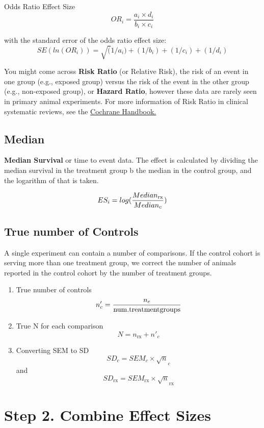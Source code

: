 \documentclass[
]{book}
\begin{document}
Odds Ratio Effect Size
\[ OR_i = \frac {a_i \times d_i}{b_i \times c_i}  \]

with the standard error of the odds ratio effect size:
\[ SE(ln(OR_i)) = \sqrt (1/a_i)+(1/b_i)+(1/c_i)+(1/d_i)    \]

You might come across \textbf{Risk Ratio} (or Relative Risk), the risk of an event in one group (e.g., exposed group) versus the risk of the event in the other group (e.g., non-exposed group), or \textbf{Hazard Ratio}, however these data are rarely seen in primary animal experiments. For more information of Risk Ratio in clinical systematic reviews, see the \href{https://handbook-5-1.cochrane.org/chapter_9/box_9_2_a_calculation_of_risk_ratio_rr_odds_ratio_or_and.htm}{Cochrane Handbook.}

\hypertarget{median}{%
\subsection{Median}\label{median}}

\textbf{Median Survival} or time to event data. The effect is calculated by dividing the median survival in the treatment group b the median in the control group, and the logarithm of that is taken.

\[ ES_i = log (\frac{Median_{\rm rx}}{Median_c} ) \]

\hypertarget{true-number-of-controls}{%
\subsection{True number of Controls}\label{true-number-of-controls}}

A single experiment can contain a number of comparisons. If the control cohort is serving more than one treatment group, we correct the number of animals reported in the control cohort by the number of treatment groups.

\begin{enumerate}
\def\labelenumi{(\arabic{enumi})}
\item
  True number of controls
  \[n'_c = \frac{n_c}{{\rm num. treatment groups}}\]
\item
  True N for each comparison
  \[N = n_{\text{rx}} + n'_c\]
\item
  Converting SEM to SD
  \[ SD_c = SEM_c \times \sqrt n_c \] and \[SD_{\text{rx}} = SEM_{\text{rx}} \times \sqrt n_{\text{rx}} \]
\end{enumerate}

\hypertarget{step-2.-combine-effect-sizes}{%
\section{Step 2. Combine Effect Sizes}\label{step-2.-combine-effect-sizes}}
\end{document}
